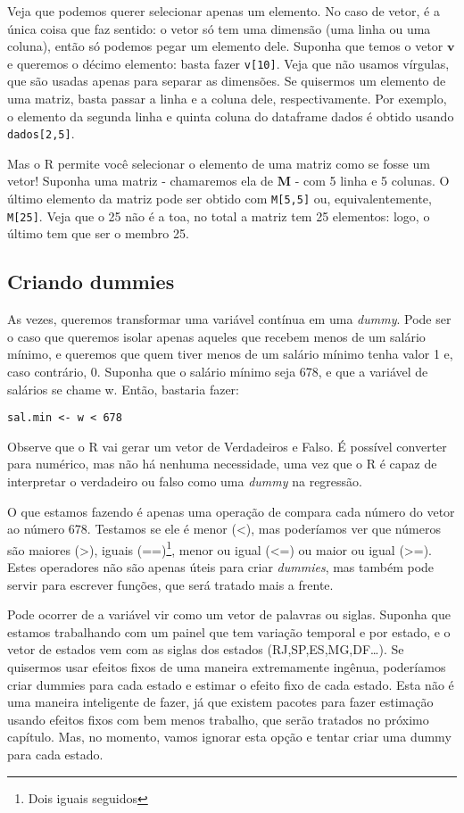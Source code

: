 \documentclass[
]{book}
\begin{document}
Veja que podemos querer selecionar apenas um elemento. No caso de vetor, é a única coisa que faz sentido: o vetor só tem uma dimensão (uma linha ou uma coluna), então só podemos pegar um elemento dele. Suponha que temos o vetor \(\mathbf{v}\) e queremos o décimo elemento: basta fazer \texttt{v{[}10{]}}. Veja que não usamos vírgulas, que são usadas apenas para separar as dimensões. Se quisermos um elemento de uma matriz, basta passar a linha e a coluna dele, respectivamente. Por exemplo, o elemento da segunda linha e quinta coluna do dataframe dados é obtido usando \texttt{dados{[}2,5{]}}.

Mas o R permite você selecionar o elemento de uma matriz como se fosse um vetor! Suponha uma matriz - chamaremos ela de \(\mathbf{M}\) - com 5 linha e 5 colunas. O último elemento da matriz pode ser obtido com \texttt{M{[}5,5{]}} ou, equivalentemente, \texttt{M{[}25{]}}. Veja que o 25 não é a toa, no total a matriz tem 25 elementos: logo, o último tem que ser o membro 25.

\subsection{Criando dummies}

As vezes, queremos transformar uma variável contínua em uma \emph{dummy}. Pode ser o caso que queremos isolar apenas aqueles que recebem menos de um salário mínimo, e queremos que quem tiver menos de um salário mínimo tenha valor 1 e, caso contrário, 0. Suponha que o salário mínimo seja 678, e que a variável de salários se chame w. Então, bastaria fazer:

\begin{verbatim}
sal.min <- w < 678
\end{verbatim}

Observe que o R vai gerar um vetor de Verdadeiros e Falso. É possível converter para numérico, mas não há nenhuma necessidade, uma vez que o R é capaz de interpretar o verdadeiro ou falso como uma \emph{dummy} na regressão.

O que estamos fazendo é apenas uma operação de compara cada número do vetor ao número 678. Testamos se ele é menor (\textless), mas poderíamos ver que números são maiores (\textgreater), iguais (==)\footnote{Dois iguais seguidos}, menor ou igual (\textless=) ou maior ou igual (\textgreater=). Estes operadores não são apenas úteis para criar \emph{dummies}, mas também pode servir para escrever funções, que será tratado mais a frente.

Pode ocorrer de a variável vir como um vetor de palavras ou siglas. Suponha que estamos trabalhando com um painel que tem variação temporal e por estado, e o vetor de estados vem com as siglas dos estados (RJ,SP,ES,MG,DF\ldots). Se quisermos usar efeitos fixos de uma maneira extremamente ingênua, poderíamos criar dummies para cada estado e estimar o efeito fixo de cada estado. Esta não é uma maneira inteligente de fazer, já que existem pacotes para fazer estimação usando efeitos fixos com bem menos trabalho, que serão tratados no próximo capítulo. Mas, no momento, vamos ignorar esta opção e tentar criar uma dummy para cada estado.
\end{document}

